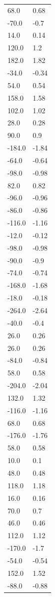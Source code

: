 \begin{longtable}{ll}
68.0 & 0.68 \\
-70.0 & -0.7 \\
14.0 & 0.14 \\
120.0 & 1.2 \\
182.0 & 1.82 \\
-34.0 & -0.34 \\
54.0 & 0.54 \\
158.0 & 1.58 \\
102.0 & 1.02 \\
28.0 & 0.28 \\
90.0 & 0.9 \\
-184.0 & -1.84 \\
-64.0 & -0.64 \\
-98.0 & -0.98 \\
82.0 & 0.82 \\
-96.0 & -0.96 \\
-86.0 & -0.86 \\
-116.0 & -1.16 \\
-12.0 & -0.12 \\
-98.0 & -0.98 \\
-90.0 & -0.9 \\
-74.0 & -0.74 \\
-168.0 & -1.68 \\
-18.0 & -0.18 \\
-264.0 & -2.64 \\
-40.0 & -0.4 \\
26.0 & 0.26 \\
26.0 & 0.26 \\
-84.0 & -0.84 \\
58.0 & 0.58 \\
-204.0 & -2.04 \\
132.0 & 1.32 \\
-116.0 & -1.16 \\
68.0 & 0.68 \\
-176.0 & -1.76 \\
58.0 & 0.58 \\
10.0 & 0.1 \\
48.0 & 0.48 \\
118.0 & 1.18 \\
16.0 & 0.16 \\
70.0 & 0.7 \\
46.0 & 0.46 \\
112.0 & 1.12 \\
-170.0 & -1.7 \\
-54.0 & -0.54 \\
152.0 & 1.52 \\
-88.0 & -0.88 \\

\end{longtable}
